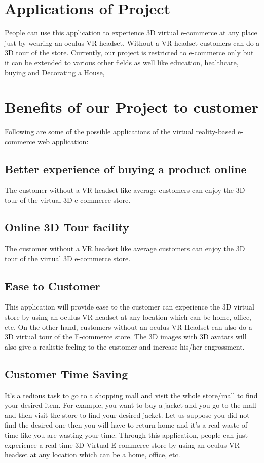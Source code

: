 \section{Applications of Project}

\justifying
People can use this application to experience 3D virtual e-commerce at any place just by wearing an oculus VR headset. Without a VR headset customers can do a 3D tour of the store. Currently, our project is restricted to e-commerce only but it can be extended to various other fields as well like education, healthcare, buying and Decorating a House,
\section{Benefits of our Project to customer}

\justifying
Following are some of the possible applications of the virtual reality-based e-commerce web application:
\subsection{Better experience of buying a product online}
The customer without a VR headset like average customers can enjoy the 3D tour of the virtual 3D e-commerce store.
\subsection{Online 3D Tour facility}
The customer without a VR headset like average customers can enjoy the 3D tour of the virtual 3D e-commerce store.
\subsection{Ease to Customer}
This application will provide ease to the customer can experience the 3D virtual store by using an oculus VR headset at any location which can be home, office, etc. On the other hand, customers without an oculus VR Headset can also do a 3D virtual tour of the E-commerce store. The 3D images with 3D avatars will also give a realistic feeling to the customer and increase his/her engrossment.
\subsection{Customer Time Saving}
\justifying
It's a tedious task to go to a shopping mall and visit the whole store/mall to find your desired item. For example, you want to buy a jacket and you go to the mall and then visit the store to find your desired jacket. Let us suppose you did not find the desired one then you will have to return home and it's a real waste of time like you are wasting your time. Through this application, people can just experience a real-time 3D Virtual E-commerce store by using an oculus VR headset at any location which can be a home, office, etc.